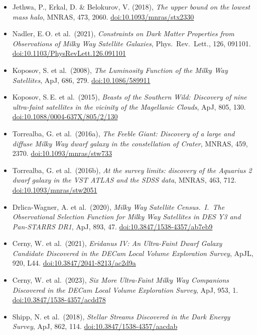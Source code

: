 \documentclass[11pt,a4paper]{article}
\begin{document}
{\begin{itemize}[leftmargin=1.2em,itemsep=0.1em,parsep=0pt,topsep=0.3em]
\item Jethwa, P., Erkal, D. \& Belokurov, V. (2018), \emph{The upper bound on the lowest mass halo}, MNRAS, 473, 2060. \href{https://doi.org/10.1093/mnras/stx2330}{doi:10.1093/mnras/stx2330}
\item Nadler, E.\,O. et al.\ (2021), \emph{Constraints on Dark Matter Properties from Observations of Milky Way Satellite Galaxies}, Phys.\ Rev.\ Lett., 126, 091101. \href{https://doi.org/10.1103/PhysRevLett.126.091101}{doi:10.1103/PhysRevLett.126.091101}
\item Koposov, S. et al.\ (2008), \emph{The Luminosity Function of the Milky Way Satellites}, ApJ, 686, 279. \href{https://doi.org/10.1086/589911}{doi:10.1086/589911}
\item Koposov, S.\,E. et al.\ (2015), \emph{Beasts of the Southern Wild: Discovery of nine ultra-faint satellites in the vicinity of the Magellanic Clouds}, ApJ, 805, 130. \href{https://doi.org/10.1088/0004-637X/805/2/130}{doi:10.1088/0004-637X/805/2/130}
\item Torrealba, G. et al.\ (2016a), \emph{The Feeble Giant: Discovery of a large and diffuse Milky Way dwarf galaxy in the constellation of Crater}, MNRAS, 459, 2370. \href{https://doi.org/10.1093/mnras/stw733}{doi:10.1093/mnras/stw733}
\item Torrealba, G. et al.\ (2016b), \emph{At the survey limits: discovery of the Aquarius 2 dwarf galaxy in the VST ATLAS and the SDSS data}, MNRAS, 463, 712. \href{https://doi.org/10.1093/mnras/stw2051}{doi:10.1093/mnras/stw2051}
\item Drlica-Wagner, A. et al.\ (2020), \emph{Milky Way Satellite Census.\ I.\ The Observational Selection Function for Milky Way Satellites in DES Y3 and Pan-STARRS DR1}, ApJ, 893, 47. \href{https://doi.org/10.3847/1538-4357/ab7eb9}{doi:10.3847/1538-4357/ab7eb9}
\item Cerny, W. et al.\ (2021), \emph{Eridanus IV: An Ultra-Faint Dwarf Galaxy Candidate Discovered in the DECam Local Volume Exploration Survey}, ApJL, 920, L44. \href{https://doi.org/10.3847/2041-8213/ac2d9a}{doi:10.3847/2041-8213/ac2d9a}
\item Cerny, W. et al.\ (2023), \emph{Six More Ultra-Faint Milky Way Companions Discovered in the DECam Local Volume Exploration Survey}, ApJ, 953, 1. \href{https://doi.org/10.3847/1538-4357/acdd78}{doi:10.3847/1538-4357/acdd78}
\item Shipp, N. et al.\ (2018), \emph{Stellar Streams Discovered in the Dark Energy Survey}, ApJ, 862, 114. \href{https://doi.org/10.3847/1538-4357/aacdab}{doi:10.3847/1538-4357/aacdab}

\end{itemize}}
\end{document}
